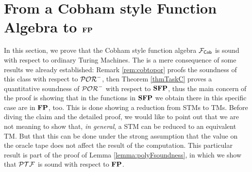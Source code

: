 \section{From a Cobham style Function Algebra to $\mathbf{FP}$}
\label{sec:polyFsoundness}

In this section, we prove that the Cobham style function algebra
$\mathcal{F}_{\mathsf{Cob}}$ is sound with respect to ordinary Turing Machines.
The is a mere consequence of some results
we already established: Remark \ref{rem:cobtopor} proofs
the soundness of this class with respect to $\mathcal{POR}^-$, then
Theorem \ref{thmTaskC} proves a quantitative soundness of $\mathcal{POR}^-$ with respect to $\mathbf{SFP}$, thus the main concern of the proof is showing
that in the functions in $\mathbf{SFP}$ we obtain there in this specific case
are in $\mathbf{FP}$, too. This is done showing a reduction from STMs to TMs.
%
Before diving the claim and the detailed proof, we would like to point out that
we are not meaning to show that, \emph{in general}, a STM can be reduced to
an equivalent TM. But that this can be done under the strong assumption
that the value on the oracle tape does not affect the result of the computation.
%
This particular result is part of the proof of Lemma \ref{lemma:polyFsoundness},
in which we show that $\mathcal{PTF}$ is sound with respect to $\mathbf{FP}$.

